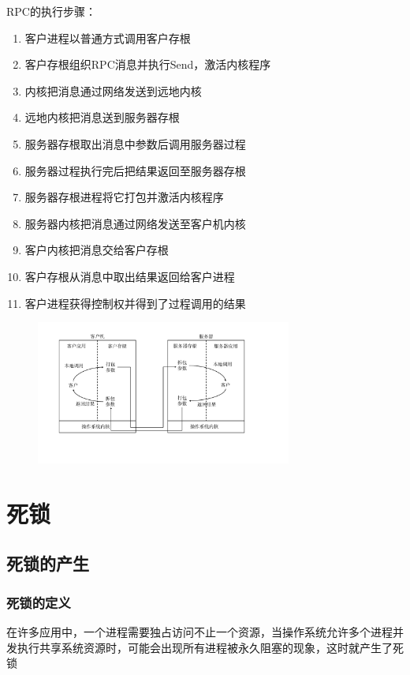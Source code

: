 \documentclass[cs4size,a4paper,10pt]{ctexart}
\begin{document}
	RPC的执行步骤：
	\begin{enumerate}[label=\arabic*.]
		\item 客户进程以普通方式调用客户存根
		\item 客户存根组织RPC消息并执行Send，激活内核程序
		\item 内核把消息通过网络发送到远地内核
		\item 远地内核把消息送到服务器存根
		\item 服务器存根取出消息中参数后调用服务器过程
		\item 服务器过程执行完后把结果返回至服务器存根
		\item 服务器存根进程将它打包并激活内核程序
		\item 服务器内核把消息通过网络发送至客户机内核
		\item 客户内核把消息交给客户存根
		\item 客户存根从消息中取出结果返回给客户进程
		\item 客户进程获得控制权并得到了过程调用的结果
	\end{enumerate}
	\begin{figure}[H]
		\centering
		\includegraphics[width=0.75\textwidth]{img/远程过程调用机制.pdf}
	\end{figure}

	\section{死锁}
	\subsection{死锁的产生}

	\subsubsection{死锁的定义}
	在许多应用中，一个进程需要独占访问不止一个资源，当操作系统允许多个进程并发执行共享系统资源时，可能会出现所有进程被永久阻塞的现象，这时就产生了死锁
\end{document}
